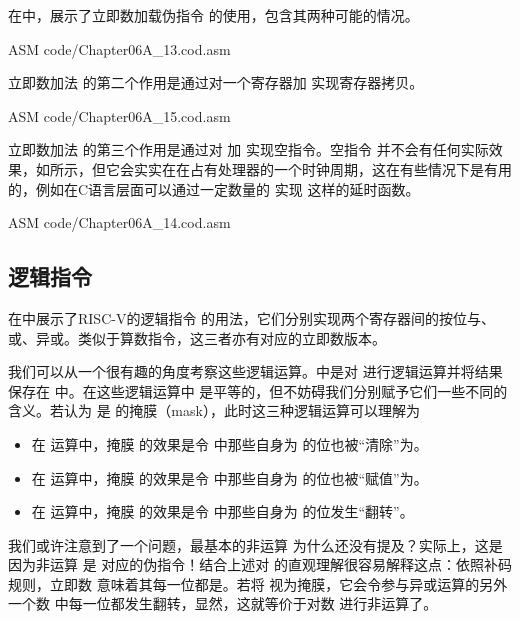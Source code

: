 在中，展示了立即数加载伪指令 的使用，包含其两种可能的情况。
\begin{Code}{ASM}
    code/Chapter06A_13.cod.asm
\end{Code}

立即数加法 的第二个作用是通过对一个寄存器加 实现寄存器拷贝。
\begin{Code}{ASM}
    code/Chapter06A_15.cod.asm
\end{Code}

立即数加法 的第三个作用是通过对 加 实现空指令。空指令 并不会有任何实际效果，如所示，但它会实实在在占有处理器的一个时钟周期，这在有些情况下是有用的，例如在C语言层面可以通过一定数量的 实现 这样的延时函数。
\begin{Code}{ASM}
    code/Chapter06A_14.cod.asm
\end{Code}

\subsection{逻辑指令}

在中展示了RISC-V的逻辑指令 的用法，它们分别实现两个寄存器间的按位与、或、异或。类似于算数指令，这三者亦有对应的立即数版本。

我们可以从一个很有趣的角度考察这些逻辑运算。中是对 进行逻辑运算并将结果保存在 中。在这些逻辑运算中 是平等的，但不妨碍我们分别赋予它们一些不同的含义。若认为 是 的掩膜（mask），此时这三种逻辑运算可以理解为
\begin{itemize}
    \item 在 运算中，掩膜 的效果是令 中那些自身为 的位也被“清除”为。
    \item 在 运算中，掩膜 的效果是令 中那些自身为 的位也被“赋值”为。
    \item 在 运算中，掩膜 的效果是令 中那些自身为 的位发生“翻转”。
\end{itemize}

我们或许注意到了一个问题，最基本的非运算 为什么还没有提及？实际上，这是因为非运算 是 对应的伪指令！结合上述对 的直观理解很容易解释这点：依照补码规则，立即数 意味着其每一位都是。若将 视为掩膜，它会令参与异或运算的另外一个数 中每一位都发生翻转，显然，这就等价于对数 进行非运算了。

